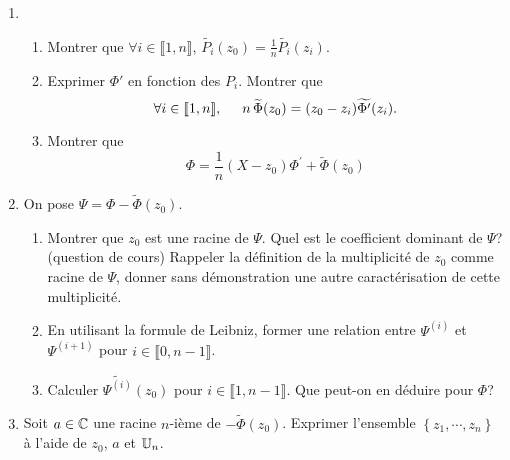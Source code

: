 \begin{enumerate}
\item 
\begin{enumerate}
\item  Montrer que $\forall i\in \llbracket 1,n \rrbracket $, $\widetilde{P_{i}}(z_{0})=\frac{1}{n}\widetilde{P_{i}}(z_{i})$.

\item  Exprimer $\Phi'$ en fonction des $P_i$. Montrer que  
\[
\forall i\in \llbracket 1,n \rrbracket,\hspace{0.5cm}
n\,\widetilde{\Phi }(z_{0}) = (z_{0}-z_{i})\widetilde{\Phi ^{\prime }}(z_{i}). 
\]

\item  Montrer que 
\[
\Phi =\frac{1}{n}(X-z_{0})\Phi ^{\prime }+\widetilde{\Phi }(z_{0}) 
\]
\end{enumerate}

\item  On pose $\Psi =\Phi -\widetilde{\Phi }(z_{0})$.
\begin{enumerate}
\item Montrer que $z_0$ est une racine de $\Psi$. Quel est le coefficient dominant de $\Psi$?\newline
(question de cours) Rappeler la définition de la multiplicité de $z_0$ comme racine de $\Psi$, donner sans démonstration une autre caractérisation de cette multiplicité.

\item  En utilisant la formule de Leibniz, former une relation entre $\Psi^{(i)}$ et $\Psi ^{(i+1)}$ pour $i\in \llbracket 0,n-1 \rrbracket $.

\item  Calculer $\widetilde{\Psi ^{(i)}}(z_{0})$ pour $i\in \llbracket 1, n-1\rrbracket$. Que peut-on en d\'{e}duire pour $\Phi $?
\end{enumerate}

\item  Soit $a\in \mathbb{C}$ une racine $n$-ième de $-\widetilde{\Phi}(z_0)$. Exprimer l'ensemble $\left\lbrace z_{1},\cdots , z_{n}\right\rbrace$ à l'aide de $z_0$, $a$ et $\mathbb{U}_n$.
\end{enumerate}

